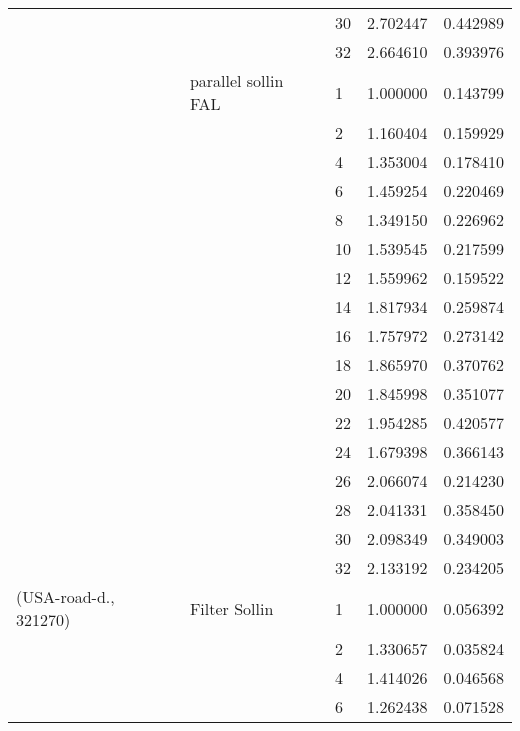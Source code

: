 \begin{tabular}{lllrr}
                      &                     & 30 &  2.702447 &  0.442989 \\
                      &                     & 32 &  2.664610 &  0.393976 \\
                      & parallel sollin FAL & 1  &  1.000000 &  0.143799 \\
                      &                     & 2  &  1.160404 &  0.159929 \\
                      &                     & 4  &  1.353004 &  0.178410 \\
                      &                     & 6  &  1.459254 &  0.220469 \\
                      &                     & 8  &  1.349150 &  0.226962 \\
                      &                     & 10 &  1.539545 &  0.217599 \\
                      &                     & 12 &  1.559962 &  0.159522 \\
                      &                     & 14 &  1.817934 &  0.259874 \\
                      &                     & 16 &  1.757972 &  0.273142 \\
                      &                     & 18 &  1.865970 &  0.370762 \\
                      &                     & 20 &  1.845998 &  0.351077 \\
                      &                     & 22 &  1.954285 &  0.420577 \\
                      &                     & 24 &  1.679398 &  0.366143 \\
                      &                     & 26 &  2.066074 &  0.214230 \\
                      &                     & 28 &  2.041331 &  0.358450 \\
                      &                     & 30 &  2.098349 &  0.349003 \\
                      &                     & 32 &  2.133192 &  0.234205 \\
(USA-road-d., 321270) & Filter Sollin & 1  &  1.000000 &  0.056392 \\
                      &                     & 2  &  1.330657 &  0.035824 \\
                      &                     & 4  &  1.414026 &  0.046568 \\
                      &                     & 6  &  1.262438 &  0.071528 \\

\end{tabular}
